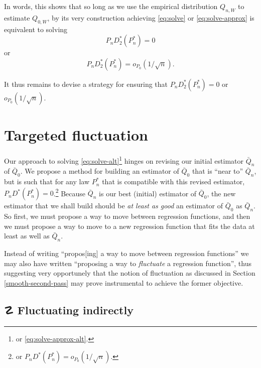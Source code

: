 \documentclass[11pt,openright,twoside]{book}
\DeclareRobustCommand{\stixdanger}{%
  {\usefont{U}{stixbbit}{m}{it}\symbol{"F6}}%
}
\newcommand{\Qbar}{\bar{Q}}
\theoremstyle{definition}
\theoremstyle{definition}
\theoremstyle{definition}
\theoremstyle{remark}
\begin{document}
In words, this shows that so long as we use the empirical distribution
\(Q_{n,W}\) to estimate \(Q_{0,W}\), by its very construction achieving
\eqref{eq:solve} or \eqref{eq:solve-approx} is equivalent to solving
\begin{equation} 
P_n  D_{2}^*(P_{n}^*)  = 0 \label{eq:solve-alt}
\end{equation}
or
\begin{equation} 
P_n D_{2}^*(P_{n}^*) = o_{P_0}(1/\sqrt{n}). \label{eq:solve-approx-alt} 
\end{equation}

It thus remains to devise a strategy for ensuring that \(P_n D_2^*(P_n^*) = 0\) or \(o_{P_0}(1/\sqrt{n})\).

\hypertarget{targeted-fluctuation-TMLE}{%
\section{Targeted fluctuation}\label{targeted-fluctuation-TMLE}}

Our approach to solving \eqref{eq:solve-alt}\footnote{or \eqref{eq:solve-approx-alt}.}
hinges on revising our initial estimator \(\Qbar_n\) of \(\Qbar_0\). We propose a
method for building an estimator of \(\Qbar_0\) that is ``near to'' \(\Qbar_n\), but
is such that for any law \(P_n^*\) that is compatible with this revised
estimator, \(P_n D^*(P_n^*) = 0\).\footnote{or \(P_n D^*(P_n^*) = o_{P_0}(1/\sqrt{n})\).}
Because \(\Qbar_n\) is our best (initial) estimator of \(\Qbar_0\), the new
estimator that we shall build should be \emph{at least as good} an estimator of
\(\Qbar_0\) as \(\Qbar_n\). So first, we must propose a way to move between
regression functions, and then we must propose a way to move to a new
regression function that fits the data at least as well as \(\Qbar_n\).

Instead of writing ``propos{[}ing{]} a way to move between regression functions'' we
may also have written ``proposing a way to \emph{fluctuate} a regression function'',
thus suggesting very opportunely that the notion of fluctuation as discussed
in Section \ref{smooth-second-pass} may prove instrumental to achieve the
former objective.

\hypertarget{fluctuating-indirectly}{%
\subsection{\texorpdfstring{☡ \stixdanger{} Fluctuating indirectly}{☡  Fluctuating indirectly}}\label{fluctuating-indirectly}}
\end{document}

